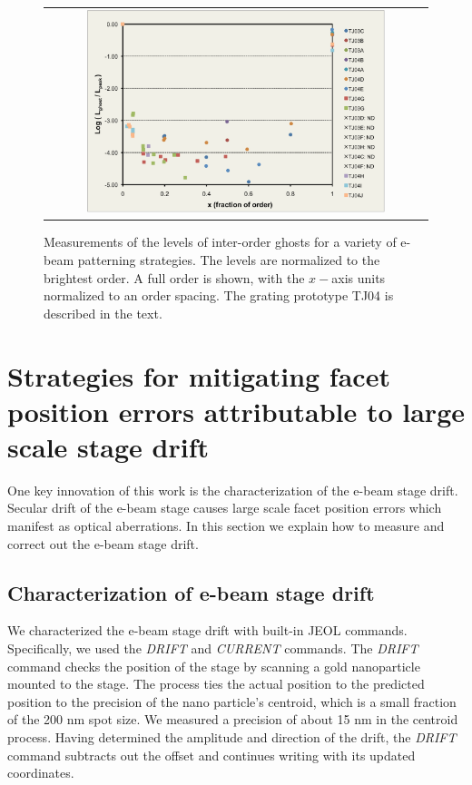 \documentclass[]{spie}  %
\begin{document}
\begin{figure}
\begin{center}
 \begin{tabular}{c}
    \includegraphics[width=0.8\textwidth]{figs/TJ04_ghosts_pretty_alt.pdf}
   \end{tabular}
  \end{center}
  \caption[Ghost level measurements]{\label{fig:GhostLevelFig} Measurements of the levels of inter-order ghosts for a variety of e-beam patterning strategies.  The levels are normalized to the brightest order.  A full order is shown, with the $x-$axis units normalized to an order spacing.  The grating prototype TJ04 is described in the text.}
\end{figure}


\section{Strategies for mitigating facet position errors attributable to large scale stage drift}

One key innovation of this work is the characterization of the e-beam stage drift.  Secular drift of the e-beam stage causes large scale facet position errors which manifest as optical aberrations.  In this section we explain how to measure and correct out the e-beam stage drift.

\subsection{Characterization of e-beam stage drift}
We characterized the e-beam stage drift with built-in JEOL commands.  Specifically, we used the \emph{DRIFT} and \emph{CURRENT} commands.  The \emph{DRIFT} command checks the position of the stage by scanning a gold nanoparticle mounted to the stage.  The process ties the actual position to the predicted position to the precision of the nano particle's centroid, which is a small fraction of the 200 nm spot size.  We measured a precision of about 15 nm in the centroid process.  Having determined the amplitude and direction of the drift, the \emph{DRIFT} command subtracts out the offset and continues writing with its updated coordinates.
\end{document}
